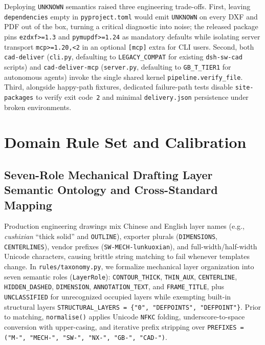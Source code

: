 \documentclass[nocopyright,nolists,upint,varvw,hyphenate]{asmejour}
\begin{document}
Deploying \texttt{UNKNOWN} semantics raised three engineering trade-offs. First, leaving \texttt{dependencies} empty in \texttt{pyproject.toml} would emit \texttt{UNKNOWN} on every DXF and PDF out of the box, turning a critical diagnostic into noise; the released package pins \texttt{ezdxf>=1.3} and \texttt{pymupdf>=1.24} as mandatory defaults while isolating server transport \texttt{mcp>=1.20,<2} in an optional \texttt{[mcp]} extra for CLI users. Second, both \texttt{cad-deliver} (\texttt{cli.py}, defaulting to \texttt{LEGACY\_COMPAT} for existing \texttt{dsh-sw-cad} scripts) and \texttt{cad-deliver-mcp} (\texttt{server.py}, defaulting to \texttt{GB\_T\_TIER1} for autonomous agents) invoke the single shared kernel \texttt{pipeline.verify\_file}. Third, alongside happy-path fixtures, dedicated failure-path tests disable \texttt{site-packages} to verify exit code~\texttt{2} and minimal \texttt{delivery.json} persistence under broken environments.

\section{Domain Rule Set and Calibration}\label{sec:rules}

\subsection{Seven-Role Mechanical Drafting Layer Semantic Ontology and Cross-Standard Mapping}\label{sec:ontology}

Production engineering drawings mix Chinese and English layer names (e.g., \emph{cushixian} ``thick solid'' and \texttt{OUTLINE}), exporter plurals (\texttt{DIMENSIONS}, \texttt{CENTERLINES}), vendor prefixes (\texttt{SW-MECH-lunkuoxian}), and full-width/half-width Unicode characters, causing brittle string matching to fail whenever templates change. In \texttt{rules/taxonomy.py}, we formalize mechanical layer organization into seven semantic roles (\texttt{LayerRole}): \texttt{CONTOUR\_THICK}, \texttt{THIN\_AUX}, \texttt{CENTERLINE}, \texttt{HIDDEN\_DASHED}, \texttt{DIMENSION}, \texttt{ANNOTATION\_TEXT}, and \texttt{FRAME\_TITLE}, plus \texttt{UNCLASSIFIED} for unrecognized occupied layers while exempting built-in structural layers \texttt{STRUCTURAL\_LAYERS = \{"0", "DEFPOINTS", "DEFPOINT"\}}. Prior to matching, \texttt{normalise()} applies Unicode \texttt{NFKC} folding, underscore-to-space conversion with upper-casing, and iterative prefix stripping over \texttt{PREFIXES = ("M-", "MECH-", "SW-", "NX-", "GB-", "CAD-")}.
\end{document}
